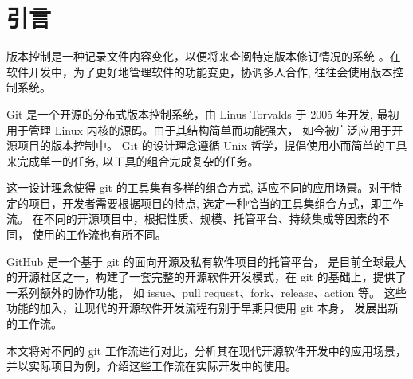 \documentclass[../main.tex]{subfiles}
\begin{document}
\section{引言}

版本控制是一种记录文件内容变化，以便将来查阅特定版本修订情况的系统
\cite{progit}。在软件开发中，为了更好地管理软件的功能变更，协调多人合作,
往往会使用版本控制系统。

Git 是一个开源的分布式版本控制系统，由 Linus Torvalds 于 2005 年开发,
最初用于管理 Linux 内核的源码。由于其结构简单而功能强大，
如今被广泛应用于开源项目的版本控制中。
Git 的设计理念遵循 Unix 哲学，提倡使用小而简单的工具来完成单一的任务,
以工具的组合完成复杂的任务。

这一设计理念使得 git 的工具集有多样的组合方式,
适应不同的应用场景。对于特定的项目，开发者需要根据项目的特点,
选定一种恰当的工具集组合方式，即工作流。
在不同的开源项目中，根据性质、规模、托管平台、持续集成等因素的不同，
使用的工作流也有所不同。

GitHub 是一个基于 git 的面向开源及私有软件项目的托管平台，
是目前全球最大的开源社区之一，构建了一套完整的开源软件开发模式，在 git 的基础上，提供了一系列额外的协作功能，
如 issue、pull request、fork、release、action 等。
这些功能的加入，让现代的开源软件开发流程有别于早期只使用 git 本身，
发展出新的工作流。

本文将对不同的 git 工作流进行对比，分析其在现代开源软件开发中的应用场景，
并以实际项目为例，介绍这些工作流在实际开发中的使用。
\end{document}
